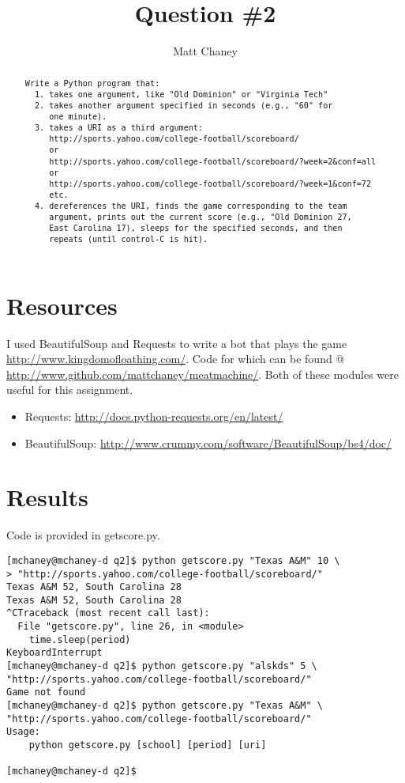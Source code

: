 \documentclass[10pt,letterpaper]{article}
\begin{document}
\lstset{language=Bash}

\title{Question \#2}
\author{Matt Chaney}

\maketitle

\begin{abstract}
\begin{verbatim}
Write a Python program that:
  1. takes one argument, like "Old Dominion" or "Virginia Tech"
  2. takes another argument specified in seconds (e.g., "60" for 
     one minute).
  3. takes a URI as a third argument: 
     http://sports.yahoo.com/college-football/scoreboard/
     or
     http://sports.yahoo.com/college-football/scoreboard/?week=2&conf=all
     or
     http://sports.yahoo.com/college-football/scoreboard/?week=1&conf=72
     etc.
  4. dereferences the URI, finds the game corresponding to the team
     argument, prints out the current score (e.g., "Old Dominion 27, 
     East Carolina 17), sleeps for the specified seconds, and then
     repeats (until control-C is hit).
\end{verbatim}
\end{abstract}

\section{Resources}
I used BeautifulSoup and Requests to write a bot that plays the game \url{http://www.kingdomofloathing.com/}.
Code for which can be found @ \url{http://www.github.com/mattchaney/meatmachine/}.
Both of these modules were useful for this assignment. 

\begin{itemize}
\item Requests: \url{http://docs.python-requests.org/en/latest/}
\item BeautifulSoup: \url{http://www.crummy.com/software/BeautifulSoup/bs4/doc/}
\end{itemize}

\section{Results}
Code is provided in getscore.py.
\begin{lstlisting}
[mchaney@mchaney-d q2]$ python getscore.py "Texas A&M" 10 \
> "http://sports.yahoo.com/college-football/scoreboard/"
Texas A&M 52, South Carolina 28
Texas A&M 52, South Carolina 28
^CTraceback (most recent call last):
  File "getscore.py", line 26, in <module>
    time.sleep(period)
KeyboardInterrupt
[mchaney@mchaney-d q2]$ python getscore.py "alskds" 5 \
"http://sports.yahoo.com/college-football/scoreboard/"
Game not found
[mchaney@mchaney-d q2]$ python getscore.py "Texas A&M" \
"http://sports.yahoo.com/college-football/scoreboard/"
Usage:
	python getscore.py [school] [period] [uri]

[mchaney@mchaney-d q2]$
\end{lstlisting}
\end{document}
